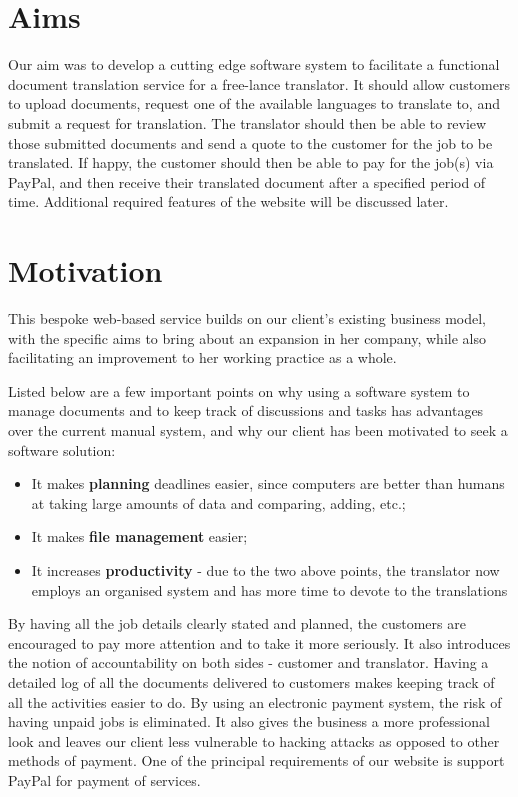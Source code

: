 \documentclass{l3proj}
\begin{document}
\section{Aims}
Our aim was to develop a cutting edge software system to facilitate a functional document translation service for a
free-lance translator. It should allow customers to upload documents, request
one of the available languages to translate to, and submit a request for
translation. The translator should then be able to review those submitted
documents and send a quote to the customer for the job to be translated. If
happy, the customer should then be able to pay for the job(s) via PayPal, and
then receive their translated document after a specified period of time.
Additional required features of the website will be discussed later. 


\section{Motivation}
This bespoke web-based service builds on our
client's existing business model, with the specific aims to bring about an
expansion in her company, while also facilitating an improvement to her working
practice as a whole.

Listed below are a few important points on why using a software system to manage
documents and to keep track of discussions and tasks has advantages over the
current manual system, and why our client has been motivated to seek a software 
solution:

\begin{itemize}
	\item
	It makes {\bf planning} deadlines easier, since computers are better than humans
	at taking large amounts of data and comparing, adding, etc.;
	\item
	It makes {\bf file management} easier;
	\item
	It increases {\bf productivity} - due to the two above points, the
translator now employs an organised system and has more time to devote to the
translations\end{itemize}

By having all the job details clearly stated and planned, the customers are
encouraged to pay more attention and to take it more seriously. It also
introduces the notion of accountability on both sides - customer and translator.
Having a detailed log of all the documents delivered to customers makes keeping
track of all the activities easier to do. By using an electronic payment system,
the risk of having unpaid jobs is eliminated. It also gives the business a more
professional look and leaves our client less vulnerable to hacking attacks as
opposed to other methods of payment. One of the principal requirements of our
website is support PayPal for payment of services. \\
\end{document}
